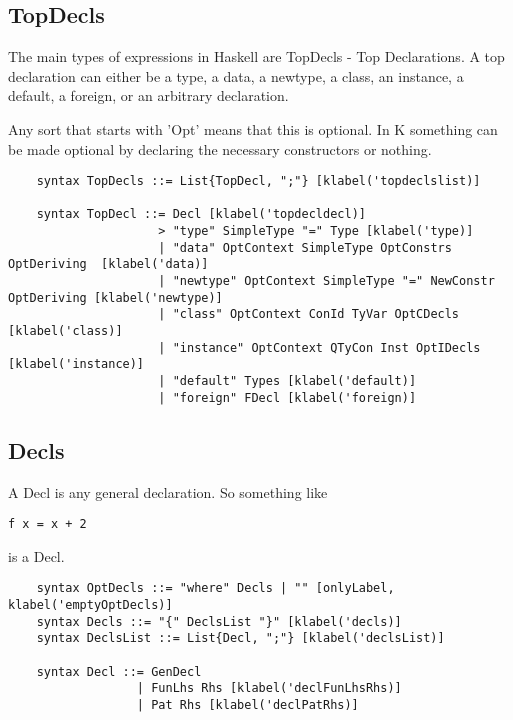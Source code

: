 \subsection{TopDecls}
The main types of expressions in Haskell are TopDecls - Top Declarations. A top declaration can either be a type, a data, a newtype, a class, an instance, a default, a foreign, or an arbitrary declaration.

Any sort that starts with 'Opt' means that this is optional. In K something can be made optional by declaring the necessary constructors or nothing.

\begin{lstlisting}
    syntax TopDecls ::= List{TopDecl, ";"} [klabel('topdeclslist)]

    syntax TopDecl ::= Decl [klabel('topdecldecl)]
                     > "type" SimpleType "=" Type [klabel('type)]
                     | "data" OptContext SimpleType OptConstrs OptDeriving  [klabel('data)]
                     | "newtype" OptContext SimpleType "=" NewConstr OptDeriving [klabel('newtype)]
                     | "class" OptContext ConId TyVar OptCDecls [klabel('class)]
                     | "instance" OptContext QTyCon Inst OptIDecls [klabel('instance)]
                     | "default" Types [klabel('default)]
                     | "foreign" FDecl [klabel('foreign)]
\end{lstlisting}

\subsection{Decls}

A Decl is any general declaration. So something like

\begin{lstlisting}
f x = x + 2
\end{lstlisting}

is a Decl.

\begin{lstlisting}
    syntax OptDecls ::= "where" Decls | "" [onlyLabel, klabel('emptyOptDecls)]
    syntax Decls ::= "{" DeclsList "}" [klabel('decls)]
    syntax DeclsList ::= List{Decl, ";"} [klabel('declsList)]

    syntax Decl ::= GenDecl
                  | FunLhs Rhs [klabel('declFunLhsRhs)]
                  | Pat Rhs [klabel('declPatRhs)]
\end{lstlisting}

